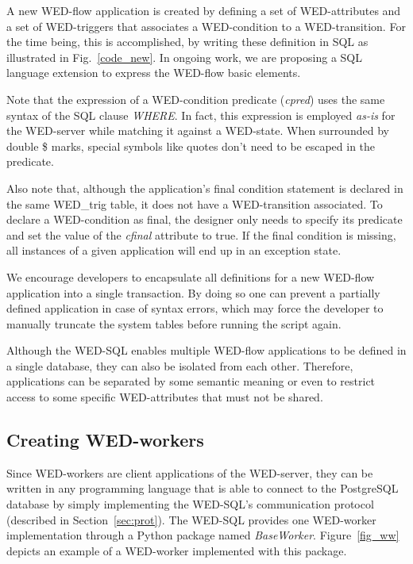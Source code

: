 \documentclass[12pt]{article}
\begin{document}
A new WED-flow application is created by defining a set of WED-attributes and a set of WED-triggers that associates a  WED-condition to a WED-transition. For the time being, this is accomplished,  by writing these definition in SQL as illustrated in Fig.~\ref{code_new}. In ongoing work, we are proposing a SQL language extension to express the WED-flow basic elements. 

\par Note that the expression of a WED-condition predicate (\emph{cpred}) uses the same syntax of the SQL clause \emph{WHERE}. In fact, this expression is employed \emph{as-is} for the WED-server while matching it against a WED-state. When surrounded by double \$ marks, special symbols like quotes don't need to be escaped in the predicate.

\par  Also note that, although the application's final condition statement is declared in the same WED\_trig table, it does not have a WED-transition associated. To declare a WED-condition as final, the designer  only needs to specify its predicate and set the value of the \emph{cfinal} attribute to true. If the final condition is missing, all instances of a given application will end up in an exception state. 

\par We encourage developers to encapsulate all definitions for a new WED-flow application into a single transaction. By doing so one can prevent a partially defined application in case of syntax errors, which may force the developer to manually truncate the system tables before running the script again. 

\par Although the WED-SQL enables multiple WED-flow applications to be defined in a single database, they can also be isolated from each other. Therefore, applications can be separated by some semantic meaning or even to restrict access to some specific  WED-attributes that must not be shared.

\subsection{Creating WED-workers}

Since WED-workers are client applications of the WED-server, they can be written in any programming language that is able to connect to the PostgreSQL database by simply implementing the WED-SQL's communication protocol (described in Section~\ref{sec:prot}). The WED-SQL provides one WED-worker implementation through a Python package named \emph{BaseWorker}. Figure~\ref{fig_ww} depicts an example of a WED-worker implemented with this package.
\end{document}
